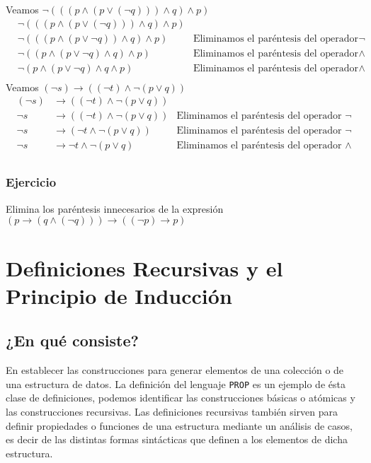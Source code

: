 \documentclass[a4paper]{article}
\begin{document}
Veamos \(\neg\left(\left(\left(p \land \left(p \lor \left(\neg q\right)\right)\right) \land q \right) \land p\right)\)
\begin{align*}
    &\neg\left(\left(\left(p \land \left(p \lor \left(\neg q\right)\right)\right) \land q \right) \land p\right) & \\
    &\neg\left(\left(\left(p \land \left(p \lor \neg q\right)\right) \land q \right) \land p\right) & \text{Eliminamos el paréntesis del operador \(\neg\)}\\
    &\neg\left(\left(p \land \left(p \lor \neg q\right) \land q \right) \land p\right) & \text{Eliminamos el paréntesis del operador \(\land\)}\\
    &\neg\left(p \land \left(p \lor \neg q\right) \land q \land p\right) & \text{Eliminamos el paréntesis del operador \(\land\)}\\
\end{align*}
Veamos \(\left(\neg s\right) \rightarrow \left(\left(\neg t\right) \land \neg \left(p \lor q\right) \right)\)
\begin{align*}
    \left(\neg s\right) &\rightarrow \left(\left(\neg t\right) \land \neg \left(p \lor q\right) \right) &\\
    \neg s &\rightarrow \left(\left(\neg t\right) \land \neg \left(p \lor q\right) \right) & \text{Eliminamos el paréntesis del operador \(\neg\)} \\
    \neg s &\rightarrow \left(\neg t \land \neg \left(p \lor q\right) \right) & \text{Eliminamos el paréntesis del operador \(\neg\)} \\
    \neg s &\rightarrow \neg t \land \neg \left(p \lor q\right) & \text{Eliminamos el paréntesis del operador \(\land\)} \\
\end{align*}
\subsubsection{Ejercicio}
\noindent
Elimina los paréntesis innecesarios de la expresión \(\left(p \rightarrow \left(q \land \left(\neg q\right)\right)\right) \rightarrow \left(\left(\neg p\right) \rightarrow p\right)\)
\section{Definiciones Recursivas y el Principio de Inducción}
\subsection{¿En qué consiste?}
\noindent
En establecer las construcciones para generar elementos de una colección o de una estructura de datos.
\newline
La definición del lenguaje \texttt{PROP} es un ejemplo de ésta clase de definiciones, podemos identificar las 
construcciones básicas o atómicas y las construcciones recursivas.
\newline 
Las definiciones recursivas también sirven para definir propiedades o funciones de una estructura mediante un
análisis de casos, es decir de las distintas formas sintácticas que definen a los elementos de dicha estructura.
\end{document}
